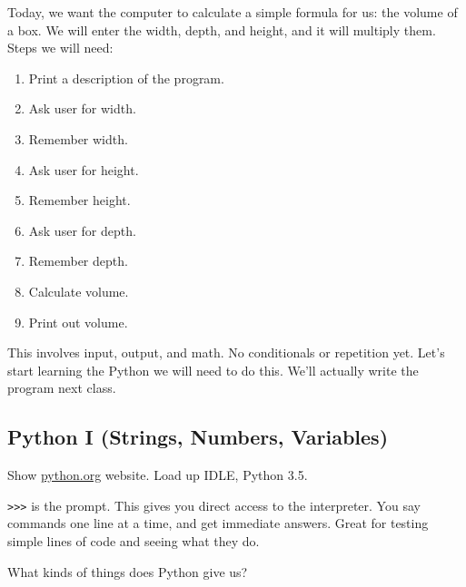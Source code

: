 \documentclass{article}
\begin{document}
Today, we want the computer to calculate a simple formula for us: the
volume of a box.  We will enter the width, depth, and height, and it
will multiply them.  Steps we will need:

\begin{enumerate}
\item Print a description of the program.
\item Ask user for width.
\item Remember width.
\item Ask user for height.
\item Remember height.
\item Ask user for depth.
\item Remember depth.
\item Calculate volume.
\item Print out volume.
\end{enumerate}

This involves input, output, and math.  No conditionals or repetition
yet.  Let's start learning the Python we will need to do this.  We'll
actually write the program next class.

\subsection*{Python I (Strings, Numbers, Variables)}

Show \url{python.org} website.  Load up IDLE, Python 3.5.

\texttt{>>>} is the prompt.  This gives you direct access to the
interpreter.  You say commands one line at a time, and get immediate
answers.  Great for testing simple lines of code and seeing what they
do.

What kinds of things does Python give us?
\end{document}
